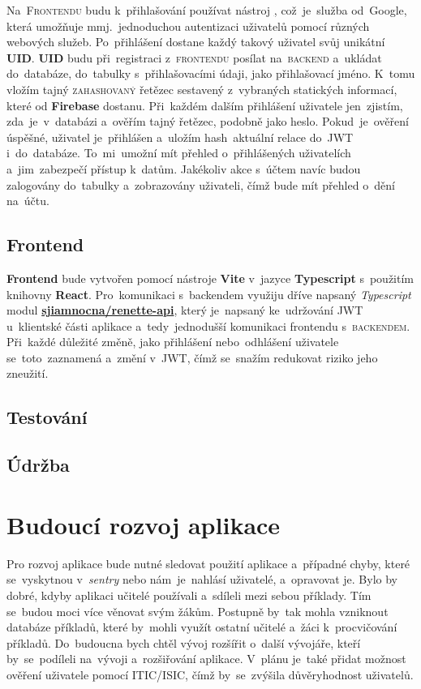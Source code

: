 \documentclass[14pt,a4paper]{article}
\begin{document}
            Na~\textsc{Frontendu} budu k~přihlašování používat nástroj \href{Google Firebase}, což~je~služba od~Google, která umožňuje mmj.~jednoduchou autentizaci uživatelů pomocí různých webových služeb. Po~přihlášení dostane každý takový uživatel svůj unikátní \textbf{UID}. \textbf{UID} budu při~registraci z~\textsc{frontendu} posílat na~\textsc{backend} a~ukládat do~databáze, do~tabulky s~přihlašovacími údaji, jako přihlašovací jméno. K~tomu vložím tajný \textsc{zahashovaný} řetězec sestavený z~vybraných statických informací, které od \textbf{Firebase} dostanu. Při~každém dalším přihlášení uživatele jen~zjistím, zda~je~v~databázi a~ověřím tajný řetězec, podobně jako heslo. Pokud~je~ověření úspěšné, uživatel je~přihlášen a~uložím hash~aktuální relace do~\textsc{JWT} i~do~databáze. To~mi~umožní mít přehled o~přihlášených uživatelích a~jim~zabezpečí přístup k~datům. Jakékoliv akce s~účtem navíc budou zalogovány do~tabulky a~zobrazovány uživateli, čímž bude mít přehled o~dění na~účtu.

        \subsection{Frontend}
            \textbf{Frontend} bude vytvořen pomocí nástroje \textbf{Vite} v~jazyce \textbf{Typescript} s~použitím knihovny \textbf{React}. Pro~komunikaci s~backendem využiju dříve napsaný \emph{Typescript} modul \href{https://gitlab.com/sjiamnocna/renette-api}{\textbf{sjiamnocna/renette-api}}, který je~napsaný ke~udržování \textsc{JWT} u~klientské části aplikace a~tedy~jednodušší komunikaci frontendu s~\textsc{backendem}. Při~každé důležité změně, jako přihlášení nebo~odhlášení uživatele se~toto~zaznamená a~změní v~\textsc{JWT}, čímž se~snažím redukovat riziko jeho zneužití.
        \subsection{Testování}
        \subsection{Údržba}
        
	\section{Budoucí rozvoj aplikace}
        Pro rozvoj aplikace bude nutné sledovat použití aplikace a~případné chyby, které se~vyskytnou v~\emph{sentry} nebo nám~je~nahlásí uživatelé, a~opravovat je.
        Bylo by dobré, kdyby aplikaci učitelé používali a~sdíleli mezi sebou příklady. Tím se~budou moci více věnovat svým žákům. Postupně by~tak mohla vzniknout databáze příkladů, které by~mohli využít ostatní učitelé a~žáci k~procvičování příkladů.
        Do~budoucna bych chtěl vývoj rozšířit o~další vývojáře, kteří by~se~podíleli na~vývoji a~rozšiřování aplikace. V~plánu je~také přidat možnost ověření uživatele pomocí ITIC/ISIC, čímž by~se~zvýšila důvěryhodnost uživatelů.
        
\end{document}
